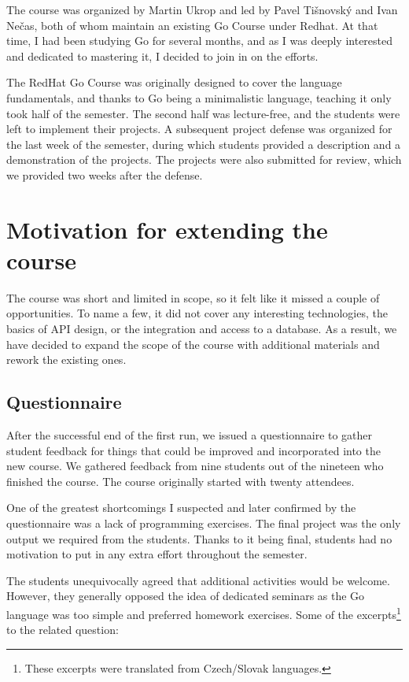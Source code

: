 \documentclass[
  digital,
  color,
  oneside,
  nosansbold,
  nocolorbold,
  lof,
  lot,
]{fithesis4}
\begin{document}
The course was organized by Martin Ukrop and led by Pavel Tišnovský and Ivan Nečas, both of whom maintain an existing Go Course \cite{redhat-go-course} under Redhat. At that time, I had been studying Go for several months, and as I was deeply interested and dedicated to mastering it, I decided to join in on the efforts.

The RedHat Go Course was originally designed to cover the language fundamentals, and thanks to Go being a minimalistic language, teaching it only took half of the semester. The second half was lecture-free, and the students were left to implement their projects. A subsequent project defense was organized for the last week of the semester, during which students provided a description and a demonstration of the projects. The projects were also submitted for review, which we provided two weeks after the defense.

\section{Motivation for extending the course}

The course was short and limited in scope, so it felt like it missed a couple of opportunities. To name a few, it did not cover any interesting technologies, the basics of API design, or the integration and access to a database. As a result, we have decided to expand the scope of the course with additional materials and rework the existing ones.

\subsection{Questionnaire}

After the successful end of the first run, we issued a questionnaire to gather student feedback for things that could be improved and incorporated into the new course. We gathered feedback from nine students out of the nineteen who finished the course. The course originally started with twenty attendees.

One of the greatest shortcomings I suspected and later confirmed by the questionnaire was a lack of programming exercises. The final project was the only output we required from the students. Thanks to it being final, students had no motivation to put in any extra effort throughout the semester.

The students unequivocally agreed that additional activities would be welcome. However, they generally opposed the idea of dedicated seminars as the Go language was too simple and preferred homework exercises. Some of the excerpts\footnote{These excerpts were translated from Czech/Slovak languages.}
to the related question: \\
\end{document}
